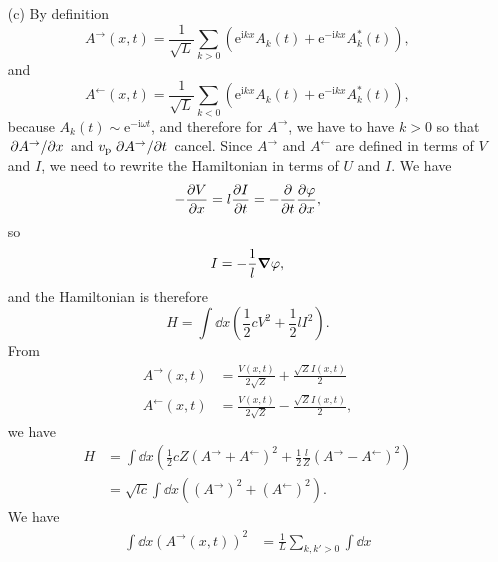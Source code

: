 \documentclass[hyperref, a4paper]{article}
\newcommand*{\ii}{\mathrm{i}}
\newcommand*{\ee}{\mathrm{e}}
\begin{document}
\begin{itemize}
\item[(c)] By definition 
\begin{equation}
    A^{\rightarrow}(x, t) = \frac{1}{\sqrt{L}} 
    \sum_{k > 0} (\ee^{\ii k x} A_k(t) + \ee^{- \ii k x} A_k^*(t)),
\end{equation}
and 
\begin{equation}
    A^{\leftarrow}(x, t) = \frac{1}{\sqrt{L}} 
    \sum_{k < 0} (\ee^{\ii k x} A_k(t) + \ee^{- \ii k x} A_k^*(t)),
\end{equation}
because $A_k(t) \sim \ee^{- \ii \omega t}$,
and therefore for $A^\rightarrow$, we have to have $k > 0$
so that $\pdv*{A^\rightarrow}{x}$ and $v_{\text{p}} \pdv*{A^\rightarrow}{t}$ cancel.
Since $A^\rightarrow$ and $A^\leftarrow$ are defined in terms of $V$ and $I$,
we need to rewrite the Hamiltonian in terms of $U$ and $I$.
We have 
\begin{equation}
    - \pdv{V}{x} = l \pdv{I}{t} = - \pdv{t} \pdv{\varphi}{x},
\end{equation}
so 
\begin{equation}
    I = - \frac{1}{l} \grad{\varphi},
\end{equation}
and the Hamiltonian is therefore 
\begin{equation}
    H = \int \dd{x} \left( \frac{1}{2} c V^2 + \frac{1}{2} l I^2 \right).
    \label{eq:transmission-u-i-ham}
\end{equation}
From
\begin{equation}
    \begin{aligned}
        A^{\rightarrow}(x, t) &=\frac{V(x, t)}{2 \sqrt{Z}}+\frac{\sqrt{Z} I(x, t)}{2} \\
        A^{\leftarrow}(x, t) &=\frac{V(x, t)}{2 \sqrt{Z}}-\frac{\sqrt{Z} I(x, t)}{2},
        \end{aligned}
\end{equation}
we have 
\begin{equation}
    \begin{aligned}
        H &= \int \dd{x}
        \left(
            \frac{1}{2} c Z (A^\rightarrow + A^\leftarrow)^2 + 
            \frac{1}{2} \frac{l}{Z} (A^\rightarrow - A^\leftarrow)^2
        \right) \\
        &= \sqrt{lc} \int \dd{x} ((A^{\rightarrow})^2 + (A^{\leftarrow})^2) .
    \end{aligned}
\end{equation}
We have 
\[
    \begin{aligned}
        \int \dd{x} (A^{\rightarrow}(x, t))^2 
        &= \frac{1}{L} \sum_{k, k' > 0} \int \dd{x}

\end{aligned}\]
\end{itemize}
\end{document}
